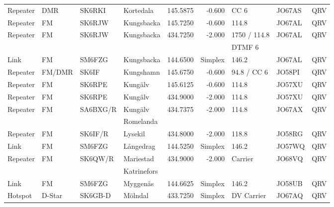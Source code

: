 \begin{longtable}{llllrrlll}
Repeater & DMR       & SK6RKI   & Kortedala         & 145.5875     & -0.600     & CC 6         & JO67AS      & QRV      \\
Repeater & FM        & SK6RJW   & Kungsbacka        & 145.7250     & -0.600     & 114.8        & JO67AL      & QRV      \\
Repeater & FM        & SK6RJW   & Kungsbacka        & 434.7250     & -2.000     & 1750 / 114.8 & JO67AL      & QRV      \\
         &           &          &                   &              &            & DTMF 6       &             &          \\
Link     & FM        & SM6FZG   & Kungsbacka        & 144.6500     & Simplex    & 146.2        & JO67AL      & QRV      \\
Repeater & FM/DMR    & SK6IF    & Kungshamn         & 145.6750     & -0.600     & 94.8 / CC 6  & JO58PI      & QRV      \\
Repeater & FM        & SK6RPE   & Kungälv           & 145.6125     & -0.600     & 114.8        & JO57XU      & QRV      \\
Repeater & FM        & SK6RPE   & Kungälv           & 434.9000     & -2.000     & 114.8        & JO57XU      & QRV      \\
Repeater & FM        & SA6BXG/R & Kungälv           & 434.7375     & -2.000     & 114.8        & JO67AX      & QRV      \\
         &           &          & Romelanda         &              &            &              &             &          \\
Repeater & FM        & SK6IF/R  & Lysekil           & 434.8000     & -2.000     & 118.8        & JO58RG      & QRV      \\
Link     & FM        & SM6FZG   & Långedrag         & 144.5250     & Simplex    & 146.2        & JO57WQ      & QRV      \\
Repeater & FM        & SK6QW/R  & Mariestad         & 434.9000     & -2.000     & Carrier      & JO68VQ      & QRV      \\
         &           &          & Katrinefors       &              &            &              &             &          \\
Link     & FM        & SM6FZG   & Myggenäs          & 144.6625     & Simplex    & 146.2        & JO58UB      & QRV      \\
Hotspot  & D-Star    & SK6GB-D  & Mölndal           & 433.7250     & Simplex    & DV Carrier   & JO67AQ      & QRV      \\

\end{longtable}
